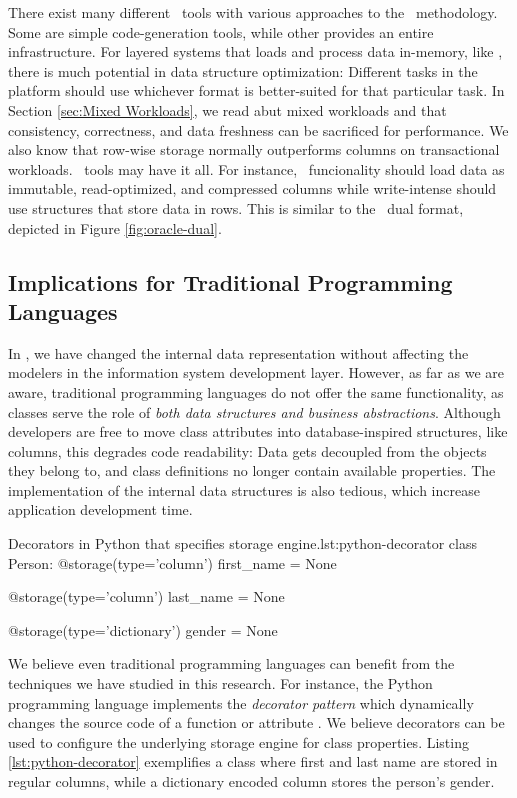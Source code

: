 There exist many different \mdd~tools with various approaches to the \mdd~methodology. Some are simple code-generation tools, while other provides an entire infrastructure. For layered systems that loads and process data in-memory, like \gap, there is much potential in data structure optimization: Different tasks in the platform should use whichever format is better-suited for that particular task. In Section \ref{sec:Mixed Workloads}, we read abut mixed workloads and that consistency, correctness, and data freshness can be sacrificed for performance. We also know that row-wise storage normally outperforms columns on transactional workloads. \mde~tools may have it all. For instance, \bd~funcionality should load data as immutable, read-optimized, and compressed columns while write-intense should use structures that store data in rows. This is similar to the \oracle~dual format, depicted in Figure \ref{fig:oracle-dual}.

\subsection{Implications for Traditional Programming Languages}
\label{sub:Implications for Traditional Programming Languages}
In \mde, we have changed the internal data representation without affecting the modelers in the information system development layer. However, as far as we are aware, traditional programming languages do not offer the same functionality, as classes serve the role of \textit{both data structures and business abstractions}. Although developers are free to move class attributes into database-inspired structures, like columns, this degrades code readability: Data gets decoupled from the objects they belong to, and class definitions no longer contain available properties. The implementation of the internal data structures is also tedious, which increase application development time.

\begin{pythoncode}{Decorators in Python that specifies storage engine.}{lst:python-decorator}
class Person:
    @storage(type='column')
    first_name = None

    @storage(type='column')
    last_name = None

    @storage(type='dictionary')
    gender = None
\end{pythoncode}
We believe even traditional programming languages can benefit from the techniques we have studied in this research. For instance, the Python programming language implements the \textit{decorator pattern} which dynamically changes the source code of a function or attribute \cite{noauthor_undated-aq}. We believe decorators can be used to configure the underlying storage engine for class properties. Listing \ref{lst:python-decorator} exemplifies a  class where first and last name are stored in regular columns, while a dictionary encoded column stores the person's gender.

